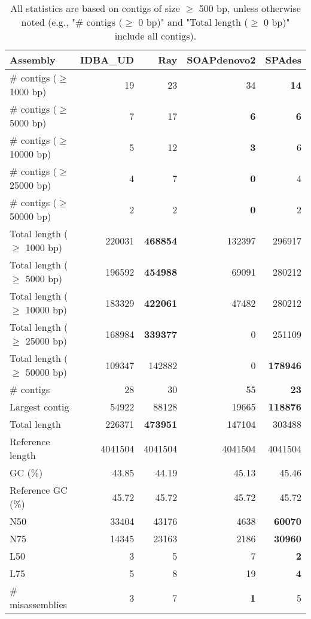 \documentclass[12pt,a4paper]{article}
\begin{document}
\begin{table}[ht]
\begin{center}
\caption{All statistics are based on contigs of size $\geq$ 500 bp, unless otherwise noted (e.g., "\# contigs ($\geq$ 0 bp)" and "Total length ($\geq$ 0 bp)" include all contigs).}
\begin{tabular}{|l*{4}{|r}|}
\hline
Assembly & IDBA\_UD & Ray & SOAPdenovo2 & SPAdes \\ \hline
\# contigs ($\geq$ 1000 bp) & 19 & 23 & 34 & {\bf 14} \\ \hline
\# contigs ($\geq$ 5000 bp) & 7 & 17 & {\bf 6} & {\bf 6} \\ \hline
\# contigs ($\geq$ 10000 bp) & 5 & 12 & {\bf 3} & 6 \\ \hline
\# contigs ($\geq$ 25000 bp) & 4 & 7 & {\bf 0} & 4 \\ \hline
\# contigs ($\geq$ 50000 bp) & 2 & 2 & {\bf 0} & 2 \\ \hline
Total length ($\geq$ 1000 bp) & 220031 & {\bf 468854} & 132397 & 296917 \\ \hline
Total length ($\geq$ 5000 bp) & 196592 & {\bf 454988} & 69091 & 280212 \\ \hline
Total length ($\geq$ 10000 bp) & 183329 & {\bf 422061} & 47482 & 280212 \\ \hline
Total length ($\geq$ 25000 bp) & 168984 & {\bf 339377} & 0 & 251109 \\ \hline
Total length ($\geq$ 50000 bp) & 109347 & 142882 & 0 & {\bf 178946} \\ \hline
\# contigs & 28 & 30 & 55 & {\bf 23} \\ \hline
Largest contig & 54922 & 88128 & 19665 & {\bf 118876} \\ \hline
Total length & 226371 & {\bf 473951} & 147104 & 303488 \\ \hline
Reference length & 4041504 & 4041504 & 4041504 & 4041504 \\ \hline
GC (\%) & 43.85 & 44.19 & 45.13 & 45.46 \\ \hline
Reference GC (\%) & 45.72 & 45.72 & 45.72 & 45.72 \\ \hline
N50 & 33404 & 43176 & 4638 & {\bf 60070} \\ \hline
N75 & 14345 & 23163 & 2186 & {\bf 30960} \\ \hline
L50 & 3 & 5 & 7 & {\bf 2} \\ \hline
L75 & 5 & 8 & 19 & {\bf 4} \\ \hline
\# misassemblies & 3 & 7 & {\bf 1} & 5 \\ \hline

\end{tabular}
\end{center}
\end{table}
\end{document}
